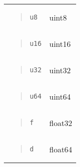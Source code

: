 \begin{longtable}[]{@{}ll@{}}
\begin{minipage}[t]{0.47\columnwidth}
\begin{quote}
\texttt{\textquotesingle{}u8}
\end{quote}\strut
\end{minipage} & \begin{minipage}[t]{0.47\columnwidth}\raggedright
uint8\strut
\end{minipage}\tabularnewline
\begin{minipage}[t]{0.47\columnwidth}\raggedright
\begin{quote}
\texttt{\textquotesingle{}u16}
\end{quote}\strut
\end{minipage} & \begin{minipage}[t]{0.47\columnwidth}\raggedright
uint16\strut
\end{minipage}\tabularnewline
\begin{minipage}[t]{0.47\columnwidth}\raggedright
\begin{quote}
\texttt{\textquotesingle{}u32}
\end{quote}\strut
\end{minipage} & \begin{minipage}[t]{0.47\columnwidth}\raggedright
uint32\strut
\end{minipage}\tabularnewline
\begin{minipage}[t]{0.47\columnwidth}\raggedright
\begin{quote}
\texttt{\textquotesingle{}u64}
\end{quote}\strut
\end{minipage} & \begin{minipage}[t]{0.47\columnwidth}\raggedright
uint64\strut
\end{minipage}\tabularnewline
\begin{minipage}[t]{0.47\columnwidth}\raggedright
\begin{quote}
\texttt{\textquotesingle{}f}
\end{quote}\strut
\end{minipage} & \begin{minipage}[t]{0.47\columnwidth}\raggedright
float32\strut
\end{minipage}\tabularnewline
\begin{minipage}[t]{0.47\columnwidth}\raggedright
\begin{quote}
\texttt{\textquotesingle{}d}
\end{quote}\strut
\end{minipage} & \begin{minipage}[t]{0.47\columnwidth}\raggedright
float64\strut
\end{minipage}\tabularnewline

\end{longtable}
